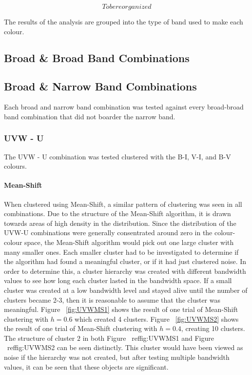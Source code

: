 
\[ To be reorganized \]

The results of the analysis are grouped into the type of band used to make each colour.  %

\subsection{Broad \& Broad Band Combinations}

\subsection{Broad \& Narrow Band Combinations}
Each broad and narrow band combination was tested against every broad-broad band combination that did not boarder the narrow band.

\subsubsection{UVW - U}
The UVW - U combination was tested clustered with the B-I, V-I, and B-V colours. %

\paragraph{Mean-Shift}
When clustered using Mean-Shift, a similar pattern of clustering was seen in all combinations.
Due to the structure of the Mean-Shift algorithm, it is drawn towards areas of high density in the distribution. %
Since the distribution of the UVW-U combinations were generally consentrated around zero in the colour-colour space, the Mean-Shift algorithm would pick out one large cluster with many smaller ones. 
Each smaller cluster had to be investigated to determine if the algorithm had found a meaningful cluster, or if it had just clustered noise.
In order to determine this, a cluster hierarchy was created with different bandwidth values to see how long each cluster lasted in the bandwidth space. 
If a small cluster was created at a low bandwidth level and stayed alive until the number of clusters became 2-3, then it is reasonable to assume that the cluster was meaningful.
Figure ~\ref{fig:UVWMS1} shows the result of one trial of Mean-Shift clustering with $h=0.6$ which created 4 clusters. 
Figure ~\ref{fig:UVWMS2} shows the result of one trial of Mean-Shift clustering with $h=0.4$, creating 10 clusters. 
The structure of cluster $2$ in both Figure ~ref{fig:UVWMS1} and Figure ~ref{fig:UVWMS2} can be seen distinctly. 
This cluster would have been viewed as noise if the hierarchy was not created, but after testing multiple bandwidth values, it can be seen that these objects are significant. 

